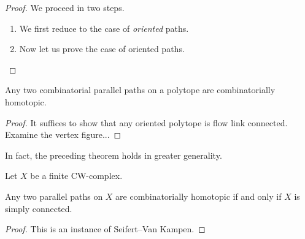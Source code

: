\begin{proof}
    We proceed in two steps. 
    \begin{enumerate}
        \item We first reduce to the case of \emph{oriented} paths. 
        \item Now let us prove the case of oriented paths. 
    \end{enumerate}
\end{proof}

\begin{corollary}
    Any two combinatorial parallel paths on a polytope are combinatorially homotopic. 
\end{corollary}

\begin{proof}
    It suffices to show that any oriented polytope is flow link connected. 
    Examine the vertex figure...
\end{proof}

In fact, the preceding theorem holds in greater generality. 



Let $X$ be a finite CW-complex. 

\begin{thm}
    Any two parallel paths on $X$ are combinatorially homotopic if and only if $X$ is simply connected.
\end{thm}

\begin{proof}
    This is an instance of Seifert--Van Kampen. 
\end{proof}




